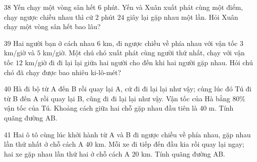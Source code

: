 \gap
\begin{probbox}{38}{}
Yến chạy một vòng sân hết $6$ phút. Yến và Xuân xuất phát cùng một điểm, chạy ngược chiều nhau thì cứ $2$ phút $24$ giây lại gặp nhau một lần. Hỏi Xuân chạy một vòng sân hết bao lâu?
\end{probbox}
\gap
\begin{probbox}{39}{}
Hai người bạn ở cách nhau $6$ km, đi ngược chiều về phía nhau với vận tốc $3$ km/giờ và $5$ km/giờ. Một chú chó xuất phát cùng người thứ nhất, chạy với vận tốc $12$ km/giờ đi đi lại lại giữa hai người cho đến khi hai người gặp nhau. Hỏi chú chó đã chạy được bao nhiêu ki-lô-mét?
\end{probbox}
\gap
\begin{probbox}{40}{}
Hà đi bộ từ A đến B rồi quay lại A, cứ đi đi lại lại như vậy; cùng lúc đó Tú đi từ B đến A rồi quay lại B, cũng đi đi lại lại như vậy. Vận tốc của Hà bằng $80\%$ vận tốc của Tú. Khoảng cách giữa hai chỗ gặp nhau đầu tiên là $40$ m. Tính quãng đường AB.
\end{probbox}
\gap
\begin{probbox}{41}{}
Hai ô tô cùng lúc khởi hành từ A và B đi ngược chiều về phía nhau, gặp nhau lần thứ nhất ở chỗ cách A $40$ km. Mỗi xe đi tiếp đến đầu kia rồi quay lại ngay; hai xe gặp nhau lần thứ hai ở chỗ cách A $20$ km. Tính quãng đường AB.
\end{probbox}
